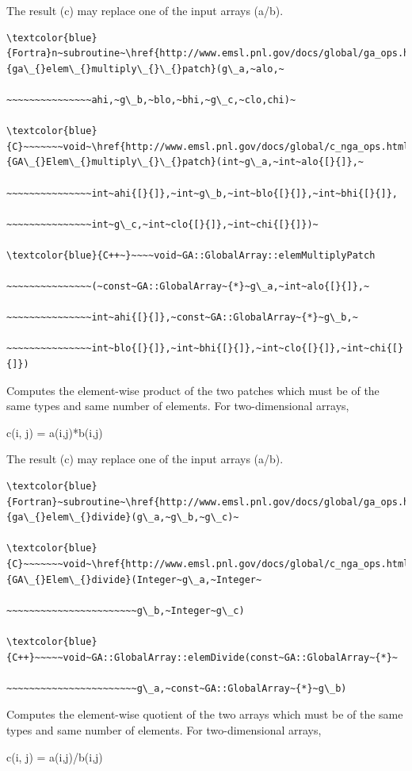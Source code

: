 The result (c) may replace one of the input arrays (a/b). 
\begin{verbatim}
\textcolor{blue}{Fortra}n~subroutine~\href{http://www.emsl.pnl.gov/docs/global/ga_ops.html\#ga_elem_multiply_patch}{ga\_{}elem\_{}multiply\_{}\_{}patch}(g\_a,~alo,~

~~~~~~~~~~~~~~~ahi,~g\_b,~blo,~bhi,~g\_c,~clo,chi)~

\textcolor{blue}{C}~~~~~~~void~\href{http://www.emsl.pnl.gov/docs/global/c_nga_ops.html\#ga_elem_multiply_patch}{GA\_{}Elem\_{}multiply\_{}\_{}patch}(int~g\_a,~int~alo{[}{]},~

~~~~~~~~~~~~~~~int~ahi{[}{]},~int~g\_b,~int~blo{[}{]},~int~bhi{[}{]},

~~~~~~~~~~~~~~~int~g\_c,~int~clo{[}{]},~int~chi{[}{]})~

\textcolor{blue}{C++~}~~~~void~GA::GlobalArray::elemMultiplyPatch

~~~~~~~~~~~~~~~(~const~GA::GlobalArray~{*}~g\_a,~int~alo{[}{]},~

~~~~~~~~~~~~~~~int~ahi{[}{]},~const~GA::GlobalArray~{*}~g\_b,~

~~~~~~~~~~~~~~~int~blo{[}{]},~int~bhi{[}{]},~int~clo{[}{]},~int~chi{[}{]})
\end{verbatim}
Computes the element-wise product of the two patches which must be
of the same types and same number of elements. For two-dimensional
arrays,

c(i, j) = a(i,j){*}b(i,j)

The result (c) may replace one of the input arrays (a/b).
\begin{verbatim}
\textcolor{blue}{Fortran}~subroutine~\href{http://www.emsl.pnl.gov/docs/global/ga_ops.html\#ga_elem_divide}{ga\_{}elem\_{}divide}(g\_a,~g\_b,~g\_c)~

\textcolor{blue}{C}~~~~~~~void~\href{http://www.emsl.pnl.gov/docs/global/c_nga_ops.html\#ga_elem_divide}{GA\_{}Elem\_{}divide}(Integer~g\_a,~Integer~

~~~~~~~~~~~~~~~~~~~~~~~g\_b,~Integer~g\_c)

\textcolor{blue}{C++}~~~~~void~GA::GlobalArray::elemDivide(const~GA::GlobalArray~{*}~

~~~~~~~~~~~~~~~~~~~~~~~g\_a,~const~GA::GlobalArray~{*}~g\_b)
\end{verbatim}
Computes the element-wise quotient of the two arrays which must be
of the same types and same number of elements. For two-dimensional
arrays,

c(i, j) = a(i,j)/b(i,j)

